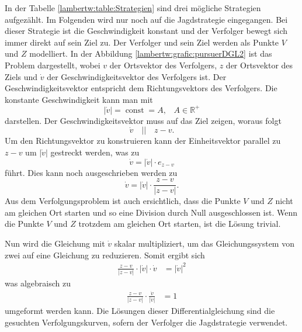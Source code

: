 %
In der Tabelle \ref{lambertw:table:Strategien} sind drei mögliche Strategien aufgezählt.
Im Folgenden wird nur noch auf die Jagdstrategie eingegangen.
Bei dieser Strategie ist die Geschwindigkeit konstant und der Verfolger bewegt sich immer direkt auf sein Ziel zu.
Der Verfolger und sein Ziel werden als Punkte $V$ und $Z$ modelliert.
In der Abbildung \ref{lambertw:grafic:pursuerDGL2} ist das Problem dargestellt,
wobei $v$ der Ortsvektor des Verfolgers, $z$ der Ortsvektor des Ziels und $\dot{v}$ der Geschwindigkeitsvektor des Verfolgers ist.
Der Geschwindigkeitsvektor entspricht dem Richtungsvektors des Verfolgers.
Die konstante Geschwindigkeit kann man mit
%
\begin{equation}
    |\dot{v}|
    = \operatorname{const} = A
    \text{,}\quad A\in\mathbb{R}^+
\end{equation}
%
darstellen. Der Geschwindigkeitsvektor muss auf das Ziel zeigen, woraus folgt
\begin{equation}
    \dot{v}
    \quad||\quad
    z-v
    \text{.}
\end{equation}
Um den Richtungsvektor zu konstruieren kann der Einheitsvektor parallel zu $z-v$ um $|\dot{v}|$ gestreckt werden, was zu
\begin{equation}
    \dot{v}
    =
    |\dot{v}|\cdot e_{z-v}
\end{equation}
führt. Dies kann noch ausgeschrieben werden zu
\begin{equation}
    \dot{v}
    =
    |\dot{v}|\cdot\frac{z-v}{|z-v|}
    \text{.}
    \label{lambertw:richtungsvektor}
\end{equation}
%
Aus dem Verfolgungsproblem ist auch ersichtlich, dass die Punkte $V$ und $Z$ nicht am gleichen Ort starten und so eine Division durch Null ausgeschlossen ist.
Wenn die Punkte $V$ und $Z$ trotzdem am gleichen Ort starten, ist die Lösung trivial.

Nun wird die Gleichung mit $\dot{v}$ skalar multipliziert, um das Gleichungssystem von zwei auf eine Gleichung zu reduzieren. Somit ergibt sich
\begin{align}
    \frac{z-v}{|z-v|}\cdot|\dot{v}|\cdot\dot{v}
    &=
    |\dot{v}|^2
\end{align}
was algebraisch zu
\begin{align}
    \label{lambertw:pursuerDGL}
    \frac{z-v}{|z-v|}\cdot \frac{\dot{v}}{|\dot{v}|}
    &=
    1
\end{align}
umgeformt werden kann.
Die Lösungen dieser Differentialgleichung sind die gesuchten Verfolgungskurven, sofern der Verfolger die Jagdstrategie verwendet.
%
